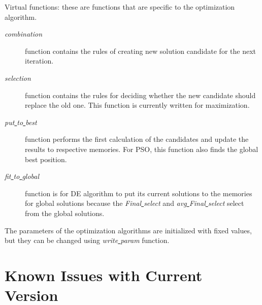 \documentclass[12pt,letterpaper]{article}
\begin{document}
        \noindent Virtual functions: these are functions that are specific to the optimization algorithm.
        
        \begin{description}
        \item[\textit{combination}] function contains the rules of creating new solution candidate for the next iteration.
        \item[\textit{selection}] function contains the rules for deciding whether the new candidate should replace the old one. This function is currently written for maximization.
        \item[\textit{put\underline{ }to\underline{ }best}] function performs the first calculation of the candidates and update the results to respective memories. For PSO, this function also finds the global best position.
        \item[\textit{fit\underline{ }to\underline{ }global}] function is for DE algorithm to put its current solutions to the memories for global solutions because the \textit{Final\underline{ }select}  and \textit{avg\underline{ }Final\underline{ }select} select from the global solutions.
        \end{description}
        
        The parameters of the optimization algorithms are initialized with fixed values, but they can be changed using \textit{write\underline{ }param} function.

\section{Known Issues with Current Version}
\end{document}
